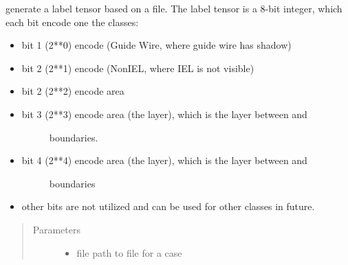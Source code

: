 \documentclass[letterpaper,10pt,english]{sphinxmanual}
\begin{document}
\begin{fulllineitems}
\label{\detokenize{index:util.read_oct_roi_file.read_oct_roi_file}}
generate a label tensor based on a  file.  The label tensor is a 8-bit integer, which each bit
encode one the classes:
\begin{itemize}
\item {} 
bit 1 (2**0) encode  (Guide Wire, where guide wire has shadow)

\item {} 
bit 2 (2**1) encode  (NonIEL, where IEL is not visible)

\item {} 
bit 2  (2**2) encode  area

\item {} \begin{description}
\item[{bit 3  (2**3) encode  area (the  layer), which is the layer between  and }] \leavevmode
boundaries.

\end{description}

\item {} \begin{description}
\item[{bit 4 (2**4) encode  area (the  layer), which is the layer between  and }] \leavevmode
boundaries

\end{description}

\item {} 
other bits are not utilized and can be used for other classes in future.

\end{itemize}
\begin{quote}\begin{description}
\item[{Parameters}] \leavevmode\begin{itemize}
\item {} 
 \textendash{} file path to  file for a case


\end{itemize}
\end{description}
\end{quote}
\end{fulllineitems}
\end{document}
